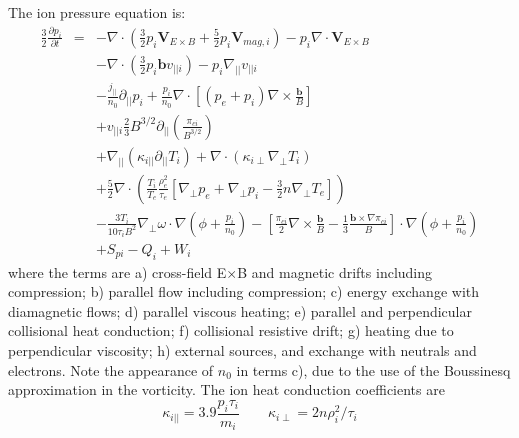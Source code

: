 \documentclass[12pt,a4paper]{article}
\begin{document}
The ion pressure equation is:
\begin{subequations}
\begin{eqnarray}
%
%
\frac{3}{2}\frac{\partial p_i}{\partial t} &=& -\nabla\cdot\left(\frac{3}{2}p_i\mathbf{V}_{E\times B} + \frac{5}{2}p_i\mathbf{V}_{mag,i}\right) - p_i\nabla\cdot\mathbf{V}_{E\times B} \\
&& -\nabla\cdot\left(\frac{3}{2}p_i\mathbf{b}v_{||i}\right)  - p_i\nabla_{||}v_{||i} \\
&& -\frac{j_{||}}{n_0}\partial_{||}p_i + \frac{p_i}{n_0}\nabla\cdot\left[\left(p_e + p_i\right)\nabla\times\frac{\mathbf{b}}{B}\right]  \\
&& + v_{||i}\frac{2}{3}B^{3/2}\partial_{||}\left(\frac{\pi_{ci}}{B^{3/2}}\right) \\
&& + \nabla_{||}\left(\kappa_{i||}\partial_{||}T_i\right) + \nabla\cdot\left(\kappa_{i\perp}\nabla_\perp T_i\right) \\
&& + \frac{5}{2}\nabla\cdot\left(\frac{T_i}{T_e}\frac{\rho_e^2}{\tau_e}\left[ \nabla_\perp p_e + \nabla_\perp p_i - \frac{3}{2}n\nabla_\perp T_e \right]\right) \\
&& - \frac{3T_i}{10\tau_iB^2}\nabla_\perp\omega\cdot\nabla\left(\phi + \frac{p_i}{n_0}\right) - \left[\frac{\pi_{ci}}{2}\nabla\times\frac{\mathbf{b}}{B} - \frac{1}{3}\frac{\mathbf{b}\times\nabla\pi_{ci}}{B}\right]\cdot\nabla\left(\phi + \frac{p_i}{n_0}\right) \\
&& + S_{pi} - Q_i + W_i
\end{eqnarray}
\end{subequations}
where the terms are a) cross-field E$\times$B and magnetic drifts including compression; b) parallel flow including compression;
c) energy exchange with diamagnetic flows; d) parallel viscous heating; e) parallel and perpendicular collisional heat conduction; f) collisional resistive drift; g) heating due to perpendicular viscosity; h)
external sources, and exchange with neutrals and electrons. Note the appearance of $n_0$ in terms c), due to the use of the Boussinesq approximation in the vorticity.
The ion heat conduction coefficients are
\begin{equation}
  \kappa_{i||} = 3.9\frac{p_i\tau_i}{m_i} \qquad \kappa_{i\perp} = 2n\rho_i^2/\tau_i
\end{equation}
\end{document}
